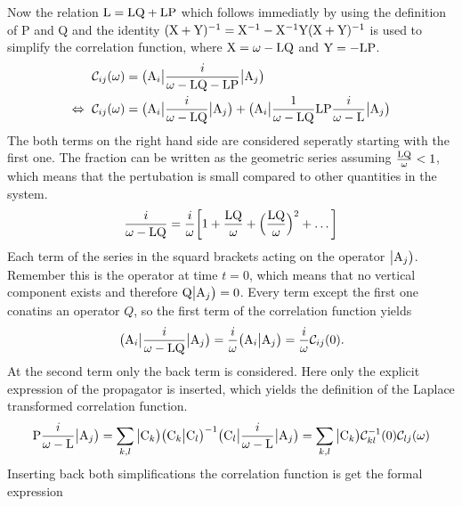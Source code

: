 Now the relation $\mathrm{L} = \mathrm{LQ} + \mathrm{LP}$ which follows immediatly by using the definition of P and Q and the identity $ (\mathrm{X} + \mathrm{Y})^{-1} = \mathrm{X}^{-1} - \mathrm{X}^{-1} \mathrm{Y} (\mathrm{X} + \mathrm{Y})^{-1}$ is used to simplify the correlation function, where $\mathrm{X} = \omega - \mathrm{LQ}$ and $\mathrm{Y} = -\mathrm{LP}$.
%
\begin{align}
	\mathcal{C}_{ij}(\omega) &= \big({\mathrm{A}_{i}}\big| \frac{i}{\omega - \mathrm{LQ} - \mathrm{LP}} \big|{\mathrm{A}_{j}}\big)
	\notag \\
	\Leftrightarrow\ \mathcal{C}_{ij}(\omega) &= \big({\mathrm{A}_{i}}\big| \frac{i}{\omega - \mathrm{LQ}} \big|{\mathrm{A}_{j}}\big) + \big({\mathrm{A}_{i}}\big| \frac{1}{\omega - \mathrm{LQ}} \mathrm{LP} \frac{i}{\omega - \mathrm{L}} \big|{\mathrm{A}_{j}}\big)
\end{align}
%
The both terms on the right hand side are considered seperatly starting with the first one.
The fraction can be written as the geometric series assuming $\frac{\mathrm{LQ}}{\omega} < 1$, which means that the pertubation is small compared to other quantities in the system. 
%
\begin{align}
	\frac{i}{\omega - \mathrm{LQ}} = \frac{i}{\omega} \bigg[1 + \frac{\mathrm{LQ}}{\omega} + \Big(\frac{\mathrm{LQ}}{\omega}\Big)^{2} + \dots \bigg]
\end{align}
%
Each term of the series in the squard brackets acting on the operator $\big|{\mathrm{A}_{j}}\big)$.
Remember this is the operator at time $t=0$, which means that no vertical component exists and therefore $\mathrm{Q}\big|{\mathrm{A}_{j}}\big) = 0$.
Every term except the first one conatins an operator $Q$, so the first term of the correlation function yields
%
\begin{align}
	\big({\mathrm{A}_{i}}\big| \frac{i}{\omega - \mathrm{LQ}} \big|{\mathrm{A}_{j}}\big) = \frac{i}{\omega} \big({\mathrm{A}_{i}}\big|{\mathrm{A}_{j}}\big) = \frac{i}{\omega} \mathcal{C}_{ij}(0).
\end{align}
%
At the second term only the back term is considered.
Here only the explicit expression of the propagator is inserted, which yields the definition of the Laplace transformed correlation function.
%
\begin{align}
	\mathrm{P} \frac{i}{\omega - \mathrm{L}} \big|{\mathrm{A}_{j}}\big) = \sum\limits_{k,l} \big|{\mathrm{C}_{k}}\big) \big({\mathrm{C}_{k}}\big|{\mathrm{C}_{l}}\big)^{-1} \big({\mathrm{C}_{l}}\big| \frac{i}{\omega - \mathrm{L}} \big|{\mathrm{A}_{j}}\big) = \sum\limits_{k,l} \big|{\mathrm{C}_{k}}\big) \mathcal{C}_{kl}^{-1}(0) \mathcal{C}_{lj}(\omega)
\end{align}
%
Inserting back both simplifications the correlation function is get the formal expression
